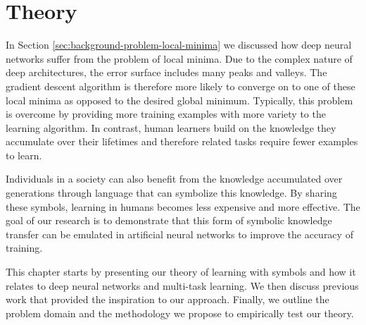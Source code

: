 \chapter{Theory} \label{sec:theory}

In Section \ref{sec:background-problem-local-minima} we discussed how deep neural networks suffer from the problem of local minima. Due to the complex nature of deep architectures, the error surface includes many peaks and valleys. The gradient descent algorithm is therefore more likely to converge on to one of these local minima as opposed to the desired global minimum\cite{Larochelle:2009:EST:1577069.1577070}. Typically, this problem is overcome by providing more training examples with more variety to the learning algorithm. In contrast, human learners build on the knowledge they accumulate over their lifetimes and therefore related tasks require fewer examples to learn\cite{Thrun1998}. 

Individuals in a society can also benefit from the knowledge accumulated over generations through language that can symbolize this knowledge. By sharing these symbols, learning in humans becomes less expensive and more effective\cite{DBLP:journals/corr/abs-1203-2990}. The goal of our research is to demonstrate that this form of symbolic knowledge transfer can be emulated in artificial neural networks to improve the accuracy of training.

This chapter starts by presenting our theory of learning with symbols and how it relates to deep neural networks and multi-task learning. We then discuss previous work that provided the inspiration to our approach. Finally, we outline the problem domain and the methodology we propose to empirically test our theory.





